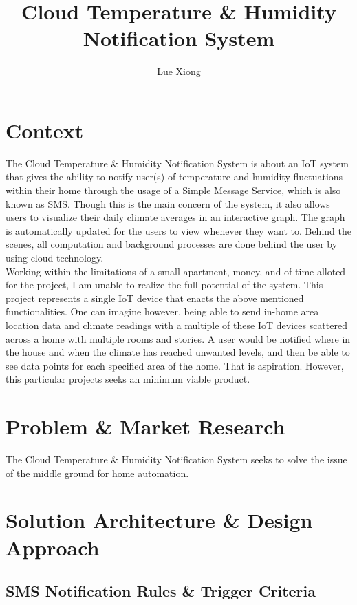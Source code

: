 \documentclass{article}
\title{Cloud Temperature \& Humidity Notification System}
\author{Lue Xiong}
\begin{document}
\maketitle
\newpage

\tableofcontents
\newpage

\obeylines

\section{Context}
The Cloud Temperature \& Humidity Notification System is about an IoT system that gives the ability to notify user(s) of temperature and humidity fluctuations within their home through the usage of a Simple Message Service, which is also known as SMS. Though this is the main concern of the system, it also allows users to visualize their daily climate averages in an interactive graph. The graph is automatically updated for the users to view whenever they want to. Behind the scenes, all computation and background processes are done behind the user by using cloud technology.\\

Working within the limitations of a small apartment, money, and of time alloted for the project, I am unable to realize the full potential of the system. This project represents a single IoT device that enacts the above mentioned functionalities. One can imagine however, being able to send in-home area location data and climate readings with a multiple of these IoT devices scattered across a home with multiple rooms and stories. A user would be notified where in the house and when the climate has reached unwanted levels, and then be able to see data points for each specified area of the home. That is aspiration. However, this particular projects seeks an minimum viable product.

\section{Problem \& Market Research}
The Cloud Temperature \& Humidity Notification System seeks to solve the issue of the middle ground for home automation.

\section{Solution Architecture \& Design Approach}
\subsection{SMS Notification Rules \& Trigger Criteria}
\end{document}
